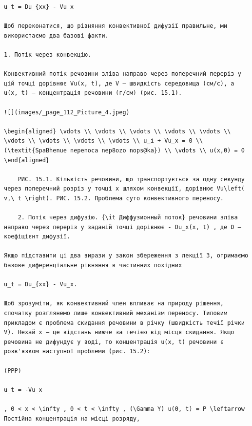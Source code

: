\documentclass[
  ukrainian,
]{article}
\begin{document}
\begin{verbatim}
u_t = Du_{xx} - Vu_x

Щоб переконатися, що рівняння конвективної дифузії правильне, ми використаємо два базові факти.

1. Потік через конвекцію.

Конвективний потік речовини зліва направо через поперечний переріз у цій точці дорівнює Vu(x, t), де V — швидкість середовища (см/с), а u(x, t) — концентрація речовини (г/см) (рис. 15.1).

![](images/_page_112_Picture_4.jpeg)

\begin{aligned} \vdots \\ \vdots \\ \vdots \\ \vdots \\ \vdots \\ \vdots \\ \vdots \\ \vdots \\ \vdots \\ u_i + Vu_x = 0 \\ (\textit{SpaBhenue nepenoca nep8ozo nops@ka}) \\ \vdots \\ u(x,0) = 0 \end{aligned}

    РИС. 15.1. Кількість речовини, що транспортується за одну секунду через поперечний розріз у точці x шляхом конвекції, дорівнює Vu\left( v,\ t \right). РИС. 15.2. Проблема суто конвективного переносу.

    2. Потік через дифузію. {\it Диффузионный поток} речовини зліва направо через переріз у заданій точці дорівнює - Du_x(x, t) , де D — коефіцієнт дифузії.

Якщо підставити ці два вирази у закон збереження з лекції 3, отримаємо базове диференціальне рівняння в частинних похідних

u_t = Du_{xx} - Vu_x.

Щоб зрозуміти, як конвективний член впливає на природу рішення, спочатку розглянемо лише конвективний механізм переносу. Типовим прикладом є проблема скидання речовини в річку (швидкість течії річки V). Нехай x — це відстань нижче за течією від місця скидання. Якщо речовина не дифундує у воді, то концентрація u(x, t) речовини є розв'язком наступної проблеми (рис. 15.2):

(PPP)

u_t = -Vu_x

, 0 < x < \infty , 0 < t < \infty , (\Gamma Y) u(0, t) = P \leftarrow Постійна концентрація на місці розряду,


\end{verbatim}
\end{document}
